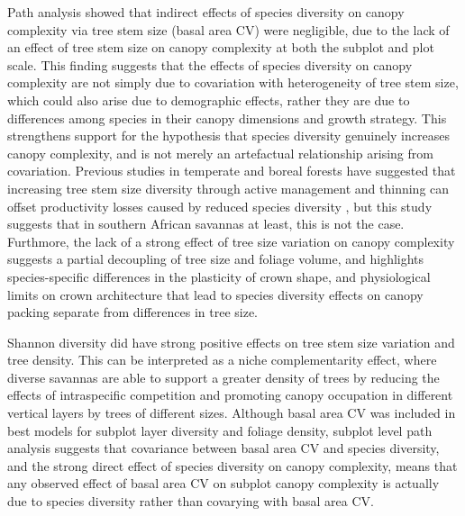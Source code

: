 \begin{refsection}
Path analysis showed that indirect effects of species diversity on canopy complexity via tree stem size (basal area CV) were negligible, due to the lack of an effect of tree stem size on canopy complexity at both the subplot and plot scale. This finding suggests that the effects of species diversity on canopy complexity are not simply due to covariation with heterogeneity of tree stem size, which could also arise due to demographic effects, rather they are due to differences among species in their canopy dimensions and growth strategy. This strengthens support for the hypothesis that species diversity genuinely increases canopy complexity, and is not merely an artefactual relationship arising from covariation. Previous studies in temperate and boreal forests have suggested that increasing tree stem size diversity through active management and thinning can offset productivity losses caused by reduced species diversity \citep{Levick2009}, but this study suggests that in southern African savannas at least, this is not the case. Furthmore, the lack of a strong effect of tree size variation on canopy complexity suggests a partial decoupling of tree size and foliage volume, and highlights species-specific differences in the plasticity of crown shape, and physiological limits on crown architecture that lead to species diversity effects on canopy packing separate from differences in tree size.

Shannon diversity did have strong positive effects on tree stem size variation and tree density. This can be interpreted as a niche complementarity effect, where diverse savannas are able to support a greater density of trees by reducing the effects of intraspecific competition and promoting canopy occupation in different vertical layers by trees of different sizes. Although basal area CV was included in best models for subplot layer diversity and foliage density, subplot level path analysis suggests that covariance between basal area CV and species diversity, and the strong direct effect of species diversity on canopy complexity, means that any observed effect of basal area CV on subplot canopy complexity is actually due to species diversity rather than covarying with basal area CV. 


\end{refsection}
